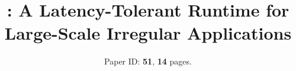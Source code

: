 
\usepackage{microtype}




\title{\Large \Grappa: A Latency-Tolerant Runtime for Large-Scale Irregular Applications}


\author{Paper ID: {\bf 51}, {\bf 14} pages.}
\date{}


\maketitle
\begin{abstract}

\end{abstract}




















%






